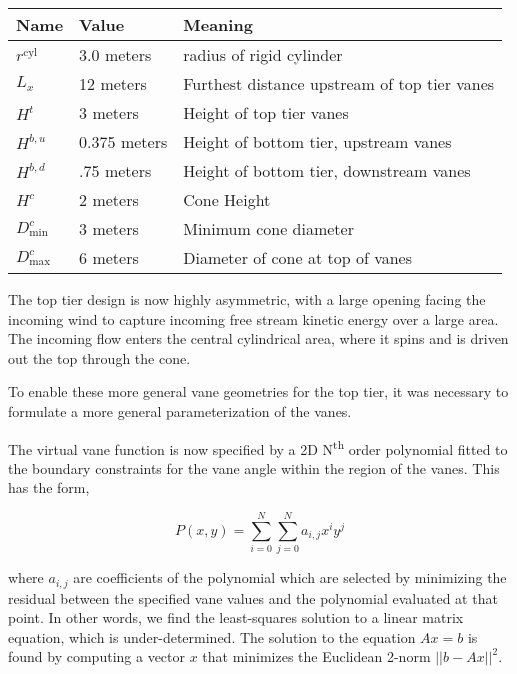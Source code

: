 \begin{table}[]
\centering
\begin{tabular}{lll}
Name                        & Value & Meaning                    \\
 \hline
$r^{\text{cyl}}$            &  3.0 meters  & radius of rigid cylinder \\
$L_x$                       &  12 meters  & Furthest distance upstream of top	 tier vanes \\
 $H^t    $                  &   3 meters  & Height of top tier vanes \\
 $H^{b,u}$                  & 0.375 meters & Height of bottom tier, upstream vanes \\
 $H^{b,d}$                  &   .75 meters& Height of bottom tier, downstream vanes \\
 $H^{c}$                    &   2 meters  & Cone Height \\
 $D^c_{\text{min}}    $     &   3 meters  & Minimum cone diameter \\
 $D^c_{\text{max}}    $     &   6 meters  & Diameter of cone at top of vanes\\
\end{tabular}
\end{table}


The top tier design is now highly asymmetric, with a
large opening facing the incoming wind to capture incoming free stream
kinetic energy over a large area. The incoming flow enters the central
cylindrical area, where it spins and is driven out the top through the
cone. 



To enable these more general vane geometries for the top tier, it was
necessary to formulate a more general parameterization of the
vanes. 

The virtual vane function is now specified by a 2D N\textsuperscript{th}
order polynomial fitted to the boundary constraints for the vane angle
within the region of the vanes. This has the form, 

\begin{equation}
 P(x,y) = \sum_{i=0}^N  \sum_{j=0}^N a_{i,j} x^i y^j
\end{equation}

where $a_{i,j}$ are coefficients of the polynomial which are selected by
minimizing the residual between the specified vane values and the
polynomial evaluated at that point. In other words, we find the
least-squares solution to a linear matrix equation, which is
under-determined. The solution to the equation $A x = b$ is found by
computing a vector $x$ that minimizes the Euclidean 2-norm $|| b - A x
||^2$. 
%
%

